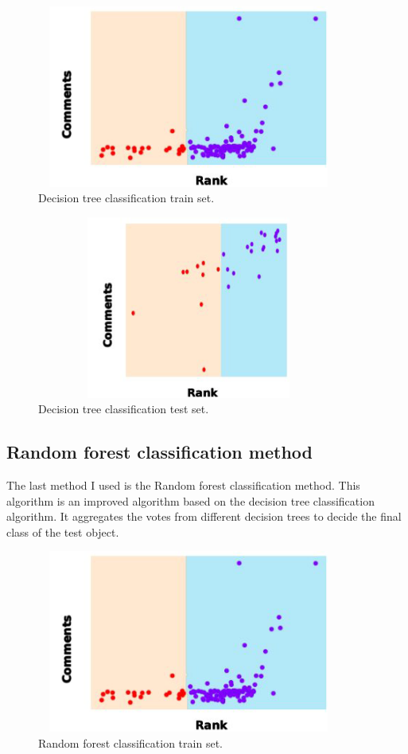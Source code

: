 \documentclass[12pt, a4paper]{article}
\begin{document}
\begin{figure}[ht]
    \centering
    \includegraphics[width=10cm,height=6cm]{p11.png}
    \caption{Decision tree classification train set.}
\end{figure}
    \begin{figure}[ht]
        \centering
        \includegraphics[width=10cm,height=6cm]{p12.png}
        \caption{Decision tree classification test set.}
 \end{figure}

\newpage
\subsection{Random forest classification method}
 The last method I used is the Random forest classification method\cite{liaw2002classification}.
 This algorithm is an improved algorithm based on the decision tree 
 classification algorithm.
 It aggregates the votes from different decision trees 
 to decide the final class of the test object.



 \begin{figure}[ht]
    \centering
    \includegraphics[width=10cm,height=6cm]{p13.png}
    \caption{Random forest classification train set.}
\end{figure}
\end{document}
